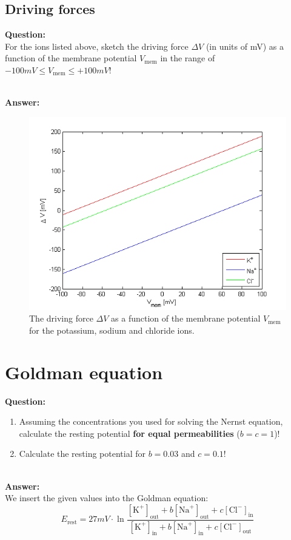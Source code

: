 \documentclass{scrartcl}
\newcommand\Answer{%
  \textbf{\\Answer:}%
}
\newcommand\Question{%
  \textbf{Question:}%
}
\begin{document}
\subsection{Driving forces}

\Question\\
For the ions listed above, sketch the driving force $\Delta \si{V}$ (in units of \si{mV}) as a function of the membrane potential $\si{V}_{\text{mem}}$ in the range of $-100 \si{mV} \leq \si{V}_{\text{mem}} \leq +100\si{mV}$!

\Answer\\
\begin{figure}[h]
\centering
\includegraphics[scale=0.7]{../pics/drivingforce}
\caption{The driving force $\Delta \si{V}$ as a function of the membrane potential $\si{V}_{\text{mem}}$ for the potassium, sodium and chloride ions.}
\end{figure}

\section{Goldman equation}
\Question
\begin{enumerate}
\item
Assuming the concentrations you used for solving the Nernst equation, calculate the resting potential \textbf{for equal permeabilities} ($b=c=1$)!
\item
Calculate the resting potential for $b = 0.03$ and $c = 0.1$!
\end{enumerate}

\Answer\\
We insert the given values into the Goldman equation:
\begin{equation*}
E_{\text{rest}} = 27 \si{mV} \cdot \ln \frac{[\text{K}^+]_{\text{out}} + b [\text{Na}^+]_{\text{out}} + c [\text{Cl}^-]_{\text{in}}}{[\text{K}^+]_{\text{in}} + b [\text{Na}^+]_{\text{in}} + c [\text{Cl}^-]_{\text{out}}}
\end{equation*}
\end{document}
